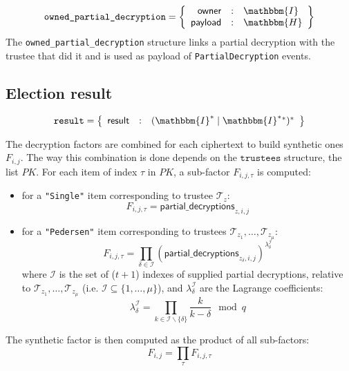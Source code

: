 \documentclass[a4paper]{article}
\newcommand{\hash}{\mathbbm{H}}
\newcommand{\I}{\mathbbm{I}}
\newcommand{\result}{\texttt{result}}
\begin{document}
\begin{gather*}
  \texttt{owned\_partial\_decryption}=\left\{
    \begin{array}{rcl}
      \textsf{owner}&:&\I\\
      \textsf{payload}&:&\hash
    \end{array}
  \right\}
\end{gather*}
The \texttt{owned\_partial\_decryption} structure links a partial
decryption with the trustee that did it and is used as payload of
\texttt{PartialDecryption} events.

\subsection{Election result}
\label{election-result}

\newcommand{\ntallied}{\textsf{num\_tallied}}
\newcommand{\etallylabel}{\textsf{encrypted\_tally}}
\newcommand{\pdlabel}{\textsf{partial\_decryptions}}
\newcommand{\resultlabel}{\textsf{result}}

\begin{gather*}
  \result=\left\{
    \begin{array}{rcl}
      \resultlabel&:&(\I^\ast\mid\I^\ast{}^\ast)^\ast
    \end{array}
  \right\}
\end{gather*}

The decryption factors are combined for each ciphertext to build
synthetic ones $F_{i,j}$. The way this combination is done depends on
the $\texttt{trustees}$ structure, the list $PK$. For each item of
index $\tau$ in $PK$, a sub-factor $F_{i,j,\tau}$ is computed:
\begin{itemize}
\item for a \texttt{"Single"} item corresponding to trustee
  $\mathcal{T}_z$:
  \[
    F_{i,j,\tau}=\pdlabel_{z,i,j}
  \]
\item for a \texttt{"Pedersen"} item corresponding to trustees
  $\mathcal{T}_{z_1},\dots,\mathcal{T}_{z_\mu}$:
  \[
    F_{i,j,\tau}=\prod_{\delta\in\mathcal{I}}(\pdlabel_{z_\delta,i,j})^{\lambda_\delta^{\mathcal{I}}}
  \]
  where $\mathcal{I}$ is the set of ($t+1$) indexes of supplied
  partial decryptions, relative to
  $\mathcal{T}_{z_1},\dots,\mathcal{T}_{z_\mu}$ (i.e. $\mathcal{I}\subseteq\{1,\dots,\mu\}$), and
  $\lambda_\delta^{\mathcal{I}}$ are the Lagrange coefficients:
  \[
    \lambda_\delta^{\mathcal{I}}=\prod_{k\in\mathcal{I}\backslash\{\delta\}}\frac{k}{k-\delta}\mod q
  \]
\end{itemize}
The synthetic factor is then computed as the product of all sub-factors:
\[
  F_{i,j}=\prod_\tau F_{i,j,\tau}
\]
\end{document}
